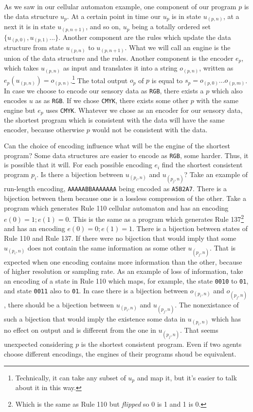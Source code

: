 As we saw in our cellular automaton example, one component of our program $p$ is the data structure $u_p$.
At a certain point in time our $u_p$ is in state $u_{(p,n)}$, at a next it is in state $u_{(p,n+1)}$, and so on, $u_{p}$ being a totally ordered set $\{u_{(p,0)},u_{(p,1)}...\}$.
Another component are the rules which update the data structure from state $u_{(p,n)}$ to $u_{(p,n+1)}$.
What we will call an engine is the union of the data structure and the rules.
Another component is the encoder $e_p$, which takes $u_{(p,n)}$ as input and translates it into a string $o_{(p,n)}$, written as $e_p(u_{(p,n)}) = o_{(p,n)}$.\footnote{Technically, it can take any subset of $u_p$ and map it, but it's easier to talk about it in this way.}
The total output $o_p$ of $p$ is equal to $s_p = o_{(p,0)}...o_{(p,m)}$.
In case we choose to encode our sensory data as \texttt{RGB}, there exists a $p$ which also encodes $u$ as as \texttt{RGB}.
If we chose \texttt{CMYK}, there exists some other $p$ with the same engine but $e_p$ uses \texttt{CMYK}.
Whatever we chose as an encoder for our sensory data, the shortest program which is consistent with the data will have the same encoder, because otherwise $p$ would not be consistent with the data.

Can the choice of encoding influence what will be the engine of the shortest program?
Some data structures are easier to encode as \texttt{RGB}, some harder.
Thus, it is possible that it will.
For each possible encoding $e_i$ find the shortest consistent program $p_i$.
Is there a bijection between $u_{(p_i,n)}$ and $u_{(p_j,n)}$?
Take an example of run-length encoding, \texttt{AAAAABBAAAAAAA} being encoded as \texttt{A5B2A7}.
There is a bijection between them because one is a lossless compression of the other.
Take a program which generates Rule 110 cellular automaton and has an encoding $e(0)=1; e(1)=0$.
This is the same as a program which generates Rule 137\footnote{Which is the same as Rule 110 but \textit{flipped} so 0 is 1 and 1 is 0.} and has an encoding $e(0)=0; e(1)=1$.
There is a bijection between states of Rule 110 and Rule 137.
If there were no bijection that would imply that some $u_{(p_i,n)}$ does not contain the same information as some other $u_{(p_j,n)}$.
That is expected when one encoding contains more information than the other, because of higher resolution or sampling rate.
As an example of loss of information, take an encoding of a state in Rule 110 which maps, for example, the state \texttt{0010} to \texttt{01}, and state \texttt{0011} also to \texttt{01}.
In case there is a bijection between $o_{(p_i,n)}$ and $o_{(p_j,n)}$, there should be a bijection between $u_{(p_i,n)}$ and $u_{(p_j,n)}$.
The nonexistance of such a bijection that would imply the existence some data in $u_{(p_i,n)}$ which has no effect on output and is different from the one in $u_{(p_j,n)}$.
That seems unexpected considering $p$ is the shortest consistent program.
Even if two agents choose different encodings, the engines of their programs shoud be equivalent.

